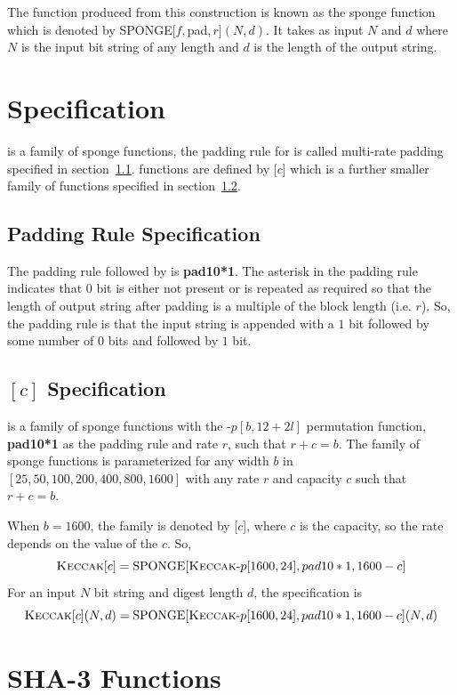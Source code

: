 The function produced from this construction is known as the sponge function which is denoted by SPONGE$[f, $pad$, r](N, d)$. It takes as input $N$ and $d$ where $N$ is the input bit string of any length and $d$ is the length of the output string.

\section{\KECCAK{} Specification}

\KECCAK{} is a family of sponge functions, the padding rule for \KECCAK{} is called multi-rate padding specified in section~\ref{padding}.  functions are defined by \KECCAK{}[$c$] which is a further smaller family of \KECCAK{} functions specified in section~\ref{keccakc}.

\subsection{Padding Rule Specification}
\label{padding}

The padding rule followed by \KECCAK{} is \textbf{pad10*1}. The asterisk in the padding rule indicates that $0$ bit is either not present or is repeated as required so that the length of output string after padding is a multiple of the block length (i.e. $r$). So, the padding rule is that the input string is appended with a $1$ bit followed by some number of $0$ bits and followed by $1$ bit.

\subsection{\KECCAK{}$[c]$ Specification}
\label{keccakc}

\KECCAK{} is a family of sponge functions with the \KECCAK{}-$p[b, 12 + 2l]$ permutation function, \textbf{pad10*1} as the padding rule and rate $r$, such that $r + c = b$. The family of sponge functions is parameterized for any width $b$ in $[25, 50,100,200,400,800,1600]$ with any rate $r$ and capacity $c$ such that $r + c = b$.

When $b = 1600$, the \KECCAK{} family is denoted by \KECCAK{}[$c$], where $c$ is the capacity, so the rate depends on the value of the $c$. So, 
\[\mbox{\textsc{Keccak}}{}[c] = \text{SPONGE}[\mbox{\textsc{Keccak}}{}\text{-}p[1600, 24], pad10*1, 1600-c]\]
For an input $N$ bit string and digest length $d$, the specification is 
\[\mbox{\textsc{Keccak}}{}[c](N, d) = \text{SPONGE}[\mbox{\textsc{Keccak}}{}\text{-}p[1600, 24], pad10*1, 1600-c](N, d)\]
\section{SHA-3 Functions}

